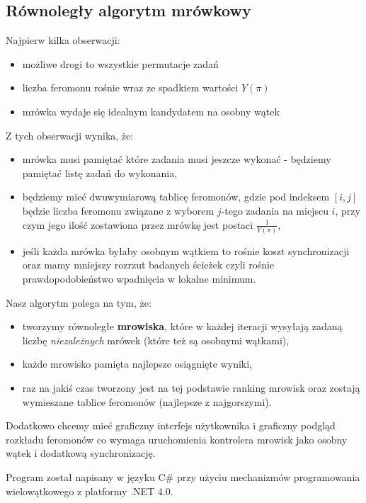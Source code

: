 \documentclass[11pt,a4paper]{beamer}
\begin{document}
\subsection{Równoległy algorytm mrówkowy}
\begin{frame}
Najpierw kilka obserwacji:
\begin{itemize}
\item możliwe drogi to wszystkie permutacje zadań
\item liczba feromonu rośnie wraz ze spadkiem wartości $Y(\pi)$
\item mrówka wydaje się idealnym kandydatem na osobny wątek
\end{itemize}
Z tych obserwacji wynika, że:
\begin{itemize}
\item mrówka musi pamiętać które zadania musi jeszcze wykonać - będziemy pamiętać listę zadań do wykonania,
\item będziemy mieć dwuwymiarową tablicę feromonów, gdzie pod indeksem $[i,j]$ będzie liczba feromonu związane z wyborem $j$-tego zadania na miejscu $i$, przy czym jego ilość zostawiona przez mrówkę jest postaci $\frac{1}{Y(\pi)}$,
\item jeśli każda mrówka byłaby osobnym wątkiem to rośnie koszt synchronizacji oraz mamy mniejszy rozrzut badanych ścieżek czyli rośnie prawdopodobieństwo wpadnięcia w lokalne minimum.
\end{itemize}
\end{frame}

\begin{frame}
Nasz algorytm polega na tym, że:
\begin{itemize}
\item tworzymy równoległe \textbf{mrowiska}, które w każdej iteracji wysyłają zadaną liczbę \textit{niezależnych} mrówek (które też są osobnymi wątkami),
\item każde mrowisko pamięta najlepsze osiągnięte wyniki,
\item raz na jakiś czas tworzony jest na tej podstawie ranking mrowisk oraz zostają wymieszane tablice feromonów (najlepsze z najgorszymi).
\end{itemize}

Dodatkowo chcemy mieć graficzny interfejs użytkownika i graficzny podgląd rozkładu feromonów co wymaga uruchomienia kontrolera mrowisk jako osobny wątek i dodatkową synchronizację.

Program został napisany w języku C\# przy użyciu mechanizmów programowania wielowątkowego z platformy .NET 4.0.
\end{frame}
\end{document}
